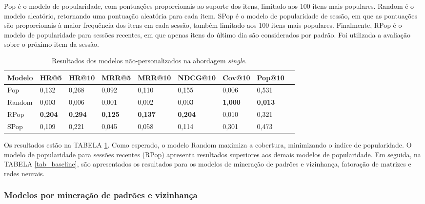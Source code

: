   Pop é o modelo de popularidade, com pontuações proporcionais ao suporte dos
  itens, limitado aos 100 itens mais populares. Random é o modelo aleatório,
  retornando uma pontuação aleatória para cada item. SPop é o modelo de
  popularidade de sessão, em que as pontuações são proporcionais à maior
  frequência dos itens em cada sessão, também limitado aos 100 itens mais
  populares. Finalmente, RPop é o modelo de popularidade para sessões recentes,
  em que apenas itens do último dia são considerados por padrão. Foi utilizada a
  avaliação sobre o próximo item da sessão.
\begin{table}[htbp]
  \centering
  \begin{tabular}
    {|l|l|l|l|l|l|l|l|l|}
    \hline
    Modelo & HR@5 & HR@10 & MRR@5 & MRR@10 & NDCG@10 & Cov@10 & Pop@10 \\ \hline
    Pop & 0,132 & 0,268 & 0,092 & 0,110 & 0,155 & 0,006 & 0,531 \\ \hline
    Random & 0,003 & 0,006 & 0,001 & 0,002 & 0,003 & \textbf{1,000} & \textbf{0,013} \\ \hline
    RPop & \textbf{0,204} & \textbf{0,294} & \textbf{0,125} & \textbf{0,137} & \textbf{0,204} & 0,010 & 0,321 \\ \hline
    SPop & 0,109 & 0,221 & 0,045 & 0,058 & 0,114 & 0,301 & 0,473 \\ \hline
  \end{tabular}
  \caption{Resultados dos modelos não-personalizados na abordagem \textit{single}.}
  \label{tab_non_perso}
\end{table}

Os resultados estão na TABELA \ref{tab_non_perso}.  Como esperado, o modelo
Random maximiza a cobertura, minimizando o índice de popularidade. O modelo de
popularidade para sessões recentes (RPop) apresenta resultados superiores aos
demais modelos de popularidade. Em seguida, na TABELA \ref{tab_baseline}, são
apresentados os resultados para os modelos de mineração de padrões e vizinhança,
fatoração de matrizes e redes neurais.


\subsubsection{Modelos por mineração de padrões e vizinhança}

